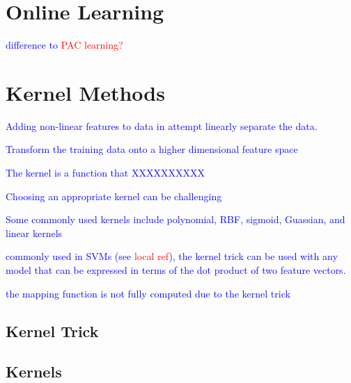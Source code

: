 \section{Online Learning}

\textcolor{blue}{difference to \textcolor{red}{PAC learning?}}


\section{Kernel Methods}
\label{sec:kernel_trick}

\textcolor{blue}{Adding non-linear features to data in attempt linearly separate the data.}


\textcolor{blue}{Transform the training data onto a higher dimensional feature space}


\textcolor{blue}{The kernel is a function that XXXXXXXXXX}

\textcolor{blue}{Choosing an appropriate kernel can be challenging}


\textcolor{blue}{Some commonly used kernels include polynomial, RBF, sigmoid, Guassian, and linear kernels}

\textcolor{blue}{commonly used in SVMs (see \textcolor{red}{local ref}), the kernel trick can be used with any model that can be expressed in terms of the dot product of two feature vectors.}

\textcolor{blue}{the mapping function is not fully computed due to the kernel trick}

\subsection{Kernel Trick}

\subsection{Kernels}

